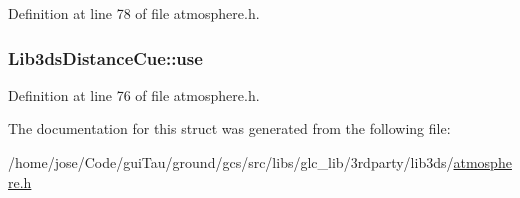 Definition at line 78 of file atmosphere.\-h.

\hypertarget{struct_lib3ds_distance_cue_a380770822ef6e9a2b8865dad59224cd7}{
\subsubsection[{use}]{ Lib3ds\-Distance\-Cue\-::use}}\label{struct_lib3ds_distance_cue_a380770822ef6e9a2b8865dad59224cd7}


Definition at line 76 of file atmosphere.\-h.



The documentation for this struct was generated from the following file\-:\begin{DoxyCompactItemize}
\item 
/home/jose/\-Code/gui\-Tau/ground/gcs/src/libs/glc\-\_\-lib/3rdparty/lib3ds/\hyperlink{atmosphere_8h}{atmosphere.\-h}\end{DoxyCompactItemize}
